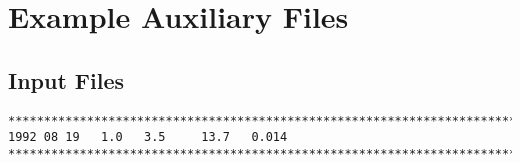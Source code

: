 \chapter{Example Auxiliary Files}\label{ChapAppendAuxFiles}
\section{Input Files}\label{ChapAppendSecInputFile}
\small
\begin{verbatim}
*******************************************************************************
1992 08 19   1.0   3.5     13.7   0.014
*******************************************************************************
\end{verbatim}
\normalsize

